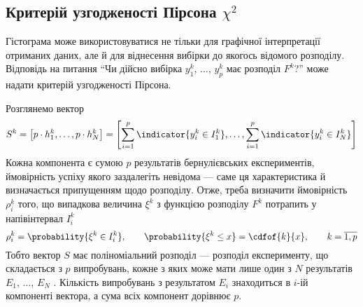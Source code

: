 \subsection{Критерій узгодженості Пірсона $\chi^2$}
Гістограма може використовуватися не тільки для графічної інтерпретації
отриманих даних, але й для віднесення вибірки до якогось відомого розподілу.
Відповідь на питання ``Чи дійсно вибірка $y_1^k$, $\dots$, $y_p^k$ має розподіл
$F^k$?'' може надати критерій узгодженості Пірсона. %

Розглянемо вектор
\begin{equation*}
  S^k
  = \left[ p \cdot h_1^k, \dots, p \cdot h_N^k \right]
  = \left[ \sum_{i=1}^{p} \indicator{y_i^k \in I_1^k}, \dots,
    \sum_{i=1}^{p} \indicator{y_i^k \in I_N^k} \right]
\end{equation*}
Кожна компонента є сумою $p$ результатів бернулієвських експериментів,
ймовірність успіху якого заздалегіть невідома --- саме ця характеристика й
визначається припущенням щодо розподілу.
Отже, треба визначити ймовірність $\rho_i^k$ того, що випадкова величина
$\xi^k$ з функцією розподілу $F^k$ потрапить у напівінтервал $I_i^k$
\begin{equation*}
  \rho_i^k = \probability{\xi^k \in I_i^k},
  \qquad \probability{\xi^k \le x} = \cdfof{k}{x},
  \qquad k = \overline{1,p}
\end{equation*}
Тобто вектор $S$ має поліноміальний розподіл --- розподіл експерименту, що
складається з $p$ випробувань, кожне з яких може мати лише один з $N$
результатів $E_1$, $\dots$, $E_N$ \cite{Cramer:1999}.
Кількість випробувань з результатом $E_i$ знаходиться в $i$-ій компоненті
вектора, а сума всіх компонент дорівнює $p$.

